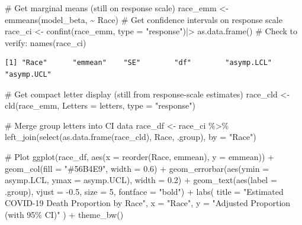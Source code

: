 \documentclass[
  letterpaper,
  DIV=11,
  numbers=noendperiod]{scrartcl}
\newenvironment{Shaded}{\begin{snugshade}}{\end{snugshade}}
\newcommand{\AttributeTok}[1]{\textcolor[rgb]{0.40,0.45,0.13}{#1}}
\newcommand{\CommentTok}[1]{\textcolor[rgb]{0.37,0.37,0.37}{#1}}
\newcommand{\DecValTok}[1]{\textcolor[rgb]{0.68,0.00,0.00}{#1}}
\newcommand{\FloatTok}[1]{\textcolor[rgb]{0.68,0.00,0.00}{#1}}
\newcommand{\FunctionTok}[1]{\textcolor[rgb]{0.28,0.35,0.67}{#1}}
\newcommand{\NormalTok}[1]{\textcolor[rgb]{0.00,0.23,0.31}{#1}}
\newcommand{\OtherTok}[1]{\textcolor[rgb]{0.00,0.23,0.31}{#1}}
\newcommand{\SpecialCharTok}[1]{\textcolor[rgb]{0.37,0.37,0.37}{#1}}
\newcommand{\StringTok}[1]{\textcolor[rgb]{0.13,0.47,0.30}{#1}}
\begin{document}
\begin{Shaded}
\begin{Highlighting}[]
\CommentTok{\# Get marginal means (still on response scale)}
\NormalTok{race\_emm }\OtherTok{\textless{}{-}} \FunctionTok{emmeans}\NormalTok{(model\_beta, }\SpecialCharTok{\textasciitilde{}}\NormalTok{ Race)}
\CommentTok{\# Get confidence intervals on response scale}
\NormalTok{race\_ci }\OtherTok{\textless{}{-}} \FunctionTok{confint}\NormalTok{(race\_emm, }\AttributeTok{type =} \StringTok{"response"}\NormalTok{)}\SpecialCharTok{|\textgreater{}}
  \FunctionTok{as.data.frame}\NormalTok{()}
\CommentTok{\# Check to verify:}
\FunctionTok{names}\NormalTok{(race\_ci)}
\end{Highlighting}
\end{Shaded}

\begin{verbatim}
[1] "Race"      "emmean"    "SE"        "df"        "asymp.LCL" "asymp.UCL"
\end{verbatim}

\begin{Shaded}
\begin{Highlighting}[]
\CommentTok{\# Get compact letter display (still from response{-}scale estimates)}
\NormalTok{race\_cld }\OtherTok{\textless{}{-}} \FunctionTok{cld}\NormalTok{(race\_emm, }\AttributeTok{Letters =}\NormalTok{ letters, }\AttributeTok{type =} \StringTok{"response"}\NormalTok{)}

\CommentTok{\# Merge group letters into CI data}
\NormalTok{race\_df }\OtherTok{\textless{}{-}}\NormalTok{ race\_ci }\SpecialCharTok{\%\textgreater{}\%}
  \FunctionTok{left\_join}\NormalTok{(}\FunctionTok{select}\NormalTok{(}\FunctionTok{as.data.frame}\NormalTok{(race\_cld), Race, .group), }\AttributeTok{by =} \StringTok{"Race"}\NormalTok{)}

\CommentTok{\# Plot}
\FunctionTok{ggplot}\NormalTok{(race\_df, }\FunctionTok{aes}\NormalTok{(}\AttributeTok{x =} \FunctionTok{reorder}\NormalTok{(Race, emmean), }\AttributeTok{y =}\NormalTok{ emmean)) }\SpecialCharTok{+}
  \FunctionTok{geom\_col}\NormalTok{(}\AttributeTok{fill =} \StringTok{"\#56B4E9"}\NormalTok{, }\AttributeTok{width =} \FloatTok{0.6}\NormalTok{) }\SpecialCharTok{+}
  \FunctionTok{geom\_errorbar}\NormalTok{(}\FunctionTok{aes}\NormalTok{(}\AttributeTok{ymin =}\NormalTok{ asymp.LCL, }\AttributeTok{ymax =}\NormalTok{ asymp.UCL), }\AttributeTok{width =} \FloatTok{0.2}\NormalTok{) }\SpecialCharTok{+}
  \FunctionTok{geom\_text}\NormalTok{(}\FunctionTok{aes}\NormalTok{(}\AttributeTok{label =}\NormalTok{ .group), }\AttributeTok{vjust =} \SpecialCharTok{{-}}\FloatTok{0.5}\NormalTok{, }\AttributeTok{size =} \DecValTok{5}\NormalTok{, }\AttributeTok{fontface =} \StringTok{"bold"}\NormalTok{) }\SpecialCharTok{+}
  \FunctionTok{labs}\NormalTok{(}
    \AttributeTok{title =} \StringTok{"Estimated COVID{-}19 Death Proportion by Race"}\NormalTok{,}
    \AttributeTok{x =} \StringTok{"Race"}\NormalTok{,}
    \AttributeTok{y =} \StringTok{"Adjusted Proportion (with 95\% CI)"}
\NormalTok{  ) }\SpecialCharTok{+}
  \FunctionTok{theme\_bw}\NormalTok{()}
\end{Highlighting}
\end{Shaded}
\end{document}
